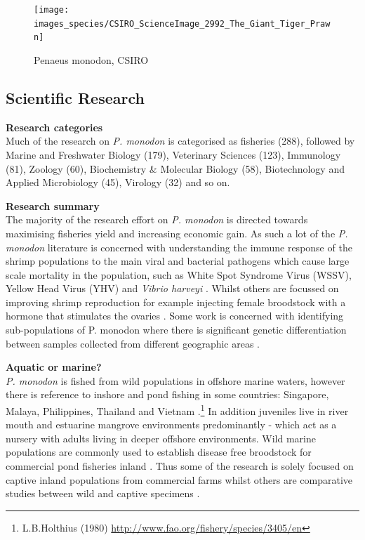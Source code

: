 \documentclass[openany]{book}
\let\rmarkdownfootnote\footnote%
\def\footnote{\protect\rmarkdownfootnote}
\theoremstyle{definition}
\theoremstyle{definition}
\theoremstyle{definition}
\theoremstyle{remark}
\begin{document}
\begin{figure}

{\centering \texttt{[image: images\_species/CSIRO\_ScienceImage\_2992\_The\_Giant\_Tiger\_Prawn]} 

}

\caption{Penaeus monodon, CSIRO}\label{fig:unnamed-chunk-8}
\end{figure}

\hypertarget{scientific-research-6}{%
\subsection{Scientific Research}\label{scientific-research-6}}

\textbf{Research categories}\\
Much of the research on \emph{P. monodon} is categorised as fisheries
(288), followed by Marine and Freshwater Biology (179), Veterinary
Sciences (123), Immunology (81), Zoology (60), Biochemistry \& Molecular
Biology (58), Biotechnology and Applied Microbiology (45), Virology (32)
and so on.

\textbf{Research summary}\\
The majority of the research effort on \emph{P. monodon} is directed
towards maximising fisheries yield and increasing economic gain. As such
a lot of the \emph{P. monodon} literature is concerned with
understanding the immune response of the shrimp populations to the main
viral and bacterial pathogens which cause large scale mortality in the
population, such as White Spot Syndrome Virus (WSSV), Yellow Head Virus
(YHV) and \emph{Vibrio harveyi} \citep{Ponprateep_2011, Jaree_2012}.
Whilst others are focussed on improving shrimp reproduction for example
injecting female broodstock with a hormone that stimulates the ovaries
\citep{Sathapondecha_2015}. Some work is concerned with identifying
sub-populations of P. monodon where there is significant genetic
differentiation between samples collected from different geographic
areas \citep{Supungul_2000}.

\textbf{Aquatic or marine?}\\
\emph{P. monodon} is fished from wild populations in offshore marine
waters, however there is reference to inshore and pond fishing in some
countries: Singapore, Malaya, Philippines, Thailand and Vietnam
\citep{Engle_2017}.\footnote{L.B.Holthius (1980)
  \url{http://www.fao.org/fishery/species/3405/en}} In addition
juveniles live in river mouth and estuarine mangrove environments
predominantly - which act as a nursery with adults living in deeper
offshore environments. Wild marine populations are commonly used to
establish disease free broodstock for commercial pond fisheries inland
\citep{Claydon_2010}. Thus some of the research is solely focused on
captive inland populations from commercial farms whilst others are
comparative studies between wild and captive specimens
\citep{Caipang_2010}.
\end{document}

